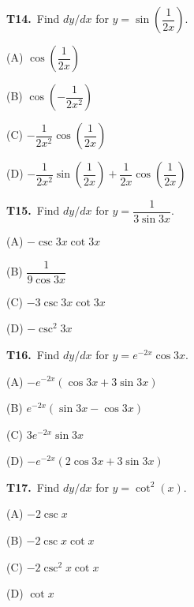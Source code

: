 \documentclass[11pt]{article}
\begin{document}
\bigskip\noindent\textbf{T14.}\ Find $dy/dx$ for $y = \sin\!\left(\dfrac{1}{2x}\right)$.
\begin{list}{}{\setlength{\leftmargin}{3em}\setlength{\labelwidth}{2.5em}\setlength{\itemsep}{0pt}\setlength{\topsep}{2pt}}
\item[(A)] $\cos\!\left(\dfrac{1}{2x}\right)$
\item[(B)] $\cos\!\left(-\dfrac{1}{2x^2}\right)$
\item[(C)] $-\dfrac{1}{2x^2}\cos\!\left(\dfrac{1}{2x}\right)$
\item[(D)] $-\dfrac{1}{2x^2}\sin\!\left(\dfrac{1}{2x}\right) + \dfrac{1}{2x}\cos\!\left(\dfrac{1}{2x}\right)$
\end{list}

\bigskip\noindent\textbf{T15.}\ Find $dy/dx$ for $y = \dfrac{1}{3\sin 3x}$.
\begin{list}{}{\setlength{\leftmargin}{3em}\setlength{\labelwidth}{2.5em}\setlength{\itemsep}{0pt}\setlength{\topsep}{2pt}}
\item[(A)] $-\csc 3x \cot 3x$
\item[(B)] $\dfrac{1}{9\cos 3x}$
\item[(C)] $-3\csc 3x \cot 3x$
\item[(D)] $-\csc^2 3x$
\end{list}

\bigskip\noindent\textbf{T16.}\ Find $dy/dx$ for $y = e^{-2x}\cos 3x$.
\begin{list}{}{\setlength{\leftmargin}{3em}\setlength{\labelwidth}{2.5em}\setlength{\itemsep}{0pt}\setlength{\topsep}{2pt}}
\item[(A)] $-e^{-2x}(\cos 3x + 3\sin 3x)$
\item[(B)] $e^{-2x}(\sin 3x - \cos 3x)$
\item[(C)] $3e^{-2x}\sin 3x$
\item[(D)] $-e^{-2x}(2\cos 3x + 3\sin 3x)$
\end{list}

\bigskip\noindent\textbf{T17.}\ Find $dy/dx$ for $y = \cot^2(x)$.
\begin{list}{}{\setlength{\leftmargin}{3em}\setlength{\labelwidth}{2.5em}\setlength{\itemsep}{0pt}\setlength{\topsep}{2pt}}
\item[(A)] $-2\csc x$
\item[(B)] $-2\csc x \cot x$
\item[(C)] $-2\csc^2 x \cot x$
\item[(D)] $\cot x$
\end{list}
\end{document}
